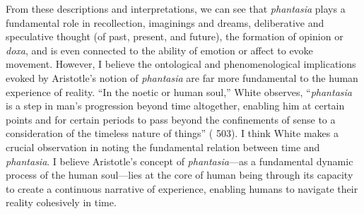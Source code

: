 From these descriptions and interpretations, we can see that \textit{phantasia} plays a fundamental role in recollection, imaginings and dreams, deliberative and speculative thought (of past, present, and future), the formation of opinion or \textit{doxa}, and is even connected to the ability of emotion or affect to evoke movement. However, I believe the ontological and phenomenological implications evoked by Aristotle's notion of \textit{phantasia} are far more fundamental to the human experience of reality. ``In the noetic or human soul,'' White observes, ``\textit{phantasia} is a step in man's progression beyond time altogether, enabling him at certain points and for certain periods to pass beyond the confinements of sense to a consideration of the timeless nature of things'' (\cite{white1985meaning} 503). I think White makes a crucial observation in noting the fundamental relation between time and \textit{phantasia}. I believe Aristotle's concept of \textit{phantasia}---as a fundamental dynamic process of the human soul---lies at the core of human being through its capacity to create a continuous narrative of experience, enabling humans to navigate their reality cohesively in time.


